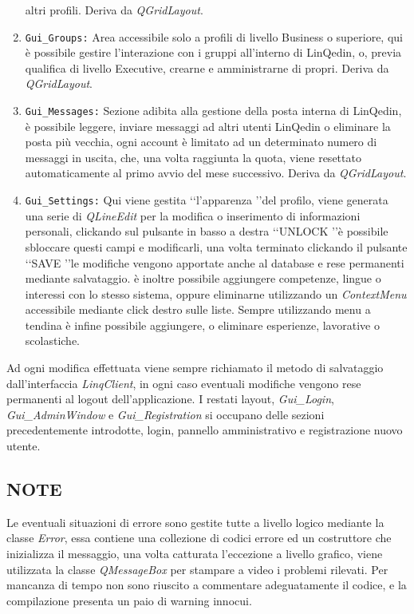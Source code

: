 \begin{enumerate}
    altri profili. Deriva da \textit{QGridLayout}.
    \item
    \texttt{Gui\_Groups:} Area accessibile solo a profili di livello Business o superiore, qui è possibile gestire l'interazione con i gruppi all'interno di LinQedin, o, previa qualifica di livello Executive,
    crearne e amministrarne di propri. Deriva da \textit{QGridLayout}.
    \item
    \texttt{Gui\_Messages:} Sezione adibita alla gestione della posta interna di LinQedin, è possibile leggere, inviare messaggi ad altri utenti LinQedin o eliminare la posta più vecchia, ogni account è limitato
    ad un determinato numero di messaggi in uscita, che, una volta raggiunta la quota, viene resettato automaticamente al primo avvio del mese successivo. Deriva da \textit{QGridLayout}.
    \item
    \texttt{Gui\_Settings:} Qui viene gestita \lq\lq l'apparenza \rq\rq del profilo, viene generata una serie di \textit{QLineEdit} per la modifica o inserimento di informazioni personali, clickando sul pulsante in basso
    a destra \lq\lq UNLOCK \rq\rq è possibile sbloccare questi campi e modificarli, una volta terminato clickando il pulsante \lq\lq SAVE \rq\rq le modifiche vengono apportate anche al database e rese permanenti mediante
    salvataggio.
    è inoltre possibile aggiungere competenze, lingue o interessi con lo stesso sistema, oppure eliminarne utilizzando un \textit{ContextMenu} accessibile mediante click destro sulle liste. Sempre utilizzando menu a tendina
    è infine possibile aggiungere, o eliminare esperienze, lavorative o scolastiche.
\end{enumerate}
Ad ogni modifica effettuata viene sempre richiamato il metodo di salvataggio dall'interfaccia \textit{LinqClient}, in ogni caso eventuali modifiche vengono rese permanenti al logout dell'applicazione.
I restati layout, \textit{Gui\_Login}, \textit{Gui\_AdminWindow} e \textit{Gui\_Registration} si occupano delle sezioni precedentemente introdotte, login, pannello amministrativo e registrazione nuovo utente.
\subsection*{NOTE}
Le eventuali situazioni di errore sono gestite tutte a livello logico mediante la classe \textit{Error}, essa contiene una collezione di codici errore ed un costruttore che inizializza il messaggio, una volta catturata l'eccezione
a livello grafico, viene utilizzata la classe \textit{QMessageBox} per stampare a video i problemi rilevati.
Per mancanza di tempo non sono riuscito a commentare adeguatamente il codice, e la compilazione presenta un paio di warning innocui.